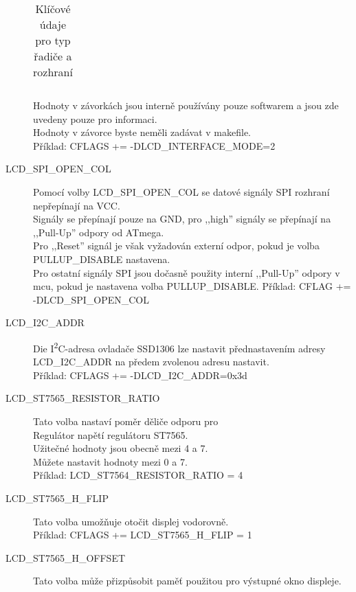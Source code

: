 \begin{description}
\begin{table}[H]
\begin{center}
\begin{tabular}{| c | c | c | c|}
    \hline
    \end{tabular}
  \end{center}
\vspace{-0,3cm}
  \caption{Klíčové údaje pro typ řadiče a rozhraní}
  \label{tab:cod-display}
\end{table}
\vspace*{-0,6cm}
Hodnoty v závorkách jsou interně používány pouze softwarem a jsou zde uvedeny pouze pro informaci.\\
Hodnoty v závorce byste neměli zadávat v makefile.\\
Příklad: CFLAGS += -DLCD\_INTERFACE\_MODE=2
\vspace{-0,3cm}
\item[LCD\_SPI\_OPEN\_COL] Pomocí volby LCD\_SPI\_OPEN\_COL se datové signály SPI rozhraní nepřepínají na VCC.
\\Signály se přepínají pouze na GND, pro ,,high'' signály se přepínají na ,,Pull-Up'' odpory od ATmega.\\
Pro ,,Reset'' signál je však vyžadován externí odpor, pokud je volba PULLUP\_DISABLE nastavena.\\
Pro ostatní signály SPI jsou dočasně použity interní ,,Pull-Up'' odpory v mcu,
pokud je nastavena volba PULLUP\_DISABLE.
Příklad: CFLAG += -DLCD\_SPI\_OPEN\_COL
\vspace{-0,3cm}
\item[LCD\_I2C\_ADDR] Die I\textsuperscript{2}C-adresa ovladače SSD1306 lze nastavit přednastavením adresy  \\ LCD\_I2C\_ADDR
na předem zvolenou adresu nastavit.\\
Příklad: CFLAGS += -DLCD\_I2C\_ADDR=0x3d
\vspace{-0,3cm}
\item[LCD\_ST7565\_RESISTOR\_RATIO] Tato volba nastaví poměr děliče odporu pro\\
Regulátor napětí regulátoru ST7565.\\ Užitečné hodnoty jsou obecně mezi 4 a 7.\\
Můžete nastavit hodnoty mezi 0 a 7. \\
Příklad: LCD\_ST7564\_RESISTOR\_RATIO = 4
\vspace{-0,3cm}
\item[LCD\_ST7565\_H\_FLIP] Tato volba umožňuje otočit displej vodorovně.\\
Příklad: CFLAGS += LCD\_ST7565\_H\_FLIP = 1
\vspace{-0,3cm}
\item[LCD\_ST7565\_H\_OFFSET] Tato volba může přizpůsobit paměť použitou pro výstupné okno displeje.

\end{description}
